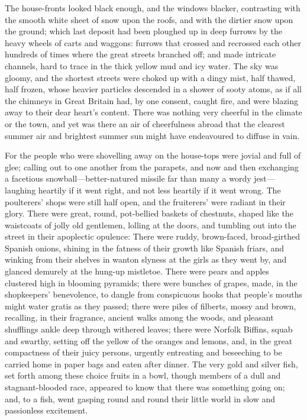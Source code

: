 The house-fronts looked black enough, and the windows black\-er, contrasting with the smooth white sheet of snow upon the roofs, and with the dirtier snow upon the ground; which last deposit had been ploughed up in deep furrows by the heavy wheels of carts and waggons: furrows that crossed and recrossed each other hundreds of times where the great streets branched off; and made intricate channels, hard to trace in the thick yellow mud and icy water. The sky was gloomy, and the shortest streets were choked up with a dingy mist, half thawed, half frozen, whose heavier particles descended in a shower of sooty atoms, as if all the chimneys in Great Britain had, by one consent, caught fire, and were blazing away to their dear heart's content. There was nothing very cheerful in the climate or the town, and yet was there an air of cheerfulness abroad that the clearest summer air and brightest summer sun might have endeavoured to diffuse in vain.

For the people who were shovelling away on the house-tops were jovial and full of glee; calling out to one another from the parapets, and now and then exchanging a facetious snowball—better-natured missile far than many a wordy jest—laughing heartily if it went right, and not less heartily if it went wrong. The poulterers' shops were still half open, and the fruiterers' were radiant in their glory. There were great, round, pot-bellied baskets of chestnuts, shaped like the waistcoats of jolly old gentlemen, lolling at the doors, and tumbling out into the street in their apoplectic opulence: There were ruddy, brown-faced, broad-girthed Spanish onions, shining in the fatness of their growth like Spanish friars, and winking from their shelves in wanton slyness at the girls as they went by, and glanced demurely at the hung-up mistletoe. There were pears and apples clustered high in blooming pyramids; there were bunches of grapes, made, in the shopkeepers' benevolence, to dangle from conspicuous hooks that people's  mouths might water gratis as they passed; there were piles of filberts, mossy and brown, recalling, in their fragrance, ancient walks among the woods, and pleasant shufflings ankle deep through withered leaves; there were Norfolk Biffins, squab and swarthy, setting off the yellow of the oranges and lemons, and, in the great compactness of their juicy persons, urgently entreating and beseeching to be carried home in paper bags and eaten after dinner. The very gold and silver fish, set forth among these choice fruits in a bowl, though members of a dull and stagnant-blooded race, appeared to know that there was something going on; and, to a fish, went gasping round and round their little world in slow and passionless excitement.

